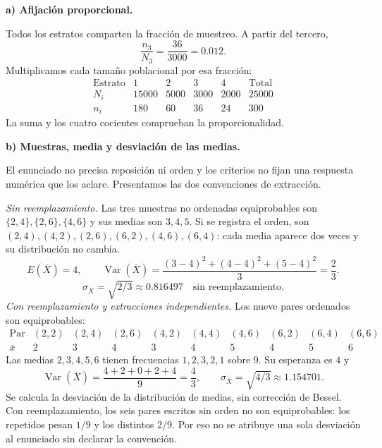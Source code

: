 \textbf{a) Afijación proporcional.}\par\nopagebreak[4]
Todos los estratos comparten la fracción de muestreo. A partir del tercero,
\[
\frac{n_3}{N_3}=\frac{36}{3000}=0.012.
\]
Multiplicamos cada tamaño poblacional por esa fracción:
\[
\begin{array}{c|rrrr|r}
\text{Estrato}&1&2&3&4&\text{Total}\\\hline
N_i&15000&5000&3000&2000&25000\\
n_i&180&60&36&24&300
\end{array}
\]
La suma y los cuatro cocientes comprueban la proporcionalidad.

\textbf{b) Muestras, media y desviación de las medias.}\par\nopagebreak[4]
El enunciado no precisa reposición ni orden y los criterios no fijan una respuesta numérica que los aclare. Presentamos las dos convenciones de extracción.

\emph{Sin reemplazamiento.} Las tres muestras no ordenadas equiprobables son $\{2,4\},\{2,6\},\{4,6\}$ y sus medias son $3,4,5$. Si se registra el orden, son $(2,4),(4,2),(2,6),(6,2),(4,6),(6,4)$: cada media aparece dos veces y su distribución no cambia.
\[
E(\overline X)=4,\qquad
\operatorname{Var}(\overline X)=\frac{(3-4)^2+(4-4)^2+(5-4)^2}{3}=\frac23.
\]
\[
\boxed{\sigma_{\overline X}=\sqrt{2/3}\approx0.816497\quad\text{sin reemplazamiento}.}
\]
\emph{Con reemplazamiento y extracciones independientes.} Los nueve pares ordenados son equiprobables:
\[
\begin{array}{c|rrrrrrrrr}
\text{Par}&(2,2)&(2,4)&(2,6)&(4,2)&(4,4)&(4,6)&(6,2)&(6,4)&(6,6)\\\hline
\overline x&2&3&4&3&4&5&4&5&6
\end{array}
\]
Las medias $2,3,4,5,6$ tienen frecuencias $1,2,3,2,1$ sobre $9$. Su esperanza es $4$ y
\[
\operatorname{Var}(\overline X)=\frac{4+2+0+2+4}{9}=\frac43,
\qquad\boxed{\sigma_{\overline X}=\sqrt{4/3}\approx1.154701.}
\]
Se calcula la desviación de la distribución de medias, sin corrección de Bessel. Con reemplazamiento, los seis pares escritos sin orden no son equiprobables: los repetidos pesan $1/9$ y los distintos $2/9$. Por eso no se atribuye una sola desviación al enunciado sin declarar la convención.

